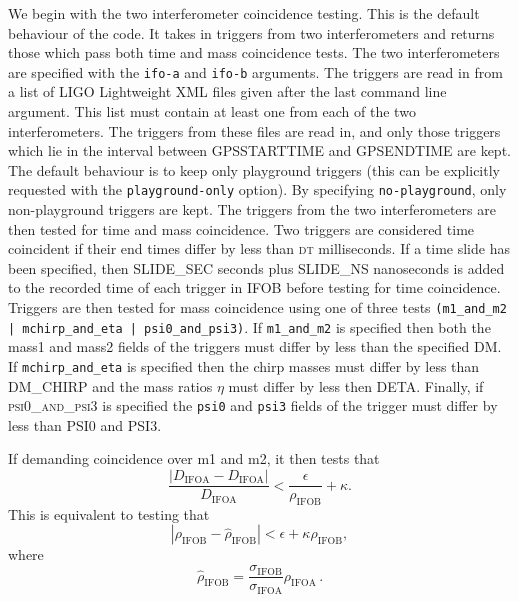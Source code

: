 \begin{entry}
We begin with the two interferometer coincidence testing.  This is the
default behaviour of the code.  It takes in triggers from two
interferometers and returns those which pass both time and mass
coincidence tests.  The two interferometers are specified with the
\texttt{ifo-a} and \texttt{ifo-b} arguments. The triggers are read in
from a list of LIGO Lightweight XML files given after the last command
line argument.  This list must contain at least one from each of the two
interferometers.  The triggers from these files are read in, and only
those triggers which lie in the interval between \textsc{GPSSTARTTIME} and
\textsc{GPSENDTIME} are kept. The default behaviour is to keep only
playground triggers (this can be explicitly requested with the
\texttt{playground-only} option).  By specifying
\texttt{no-playground}, only non-playground triggers are kept.  The
triggers from the two interferometers are then tested for time and mass
coincidence.  Two triggers are considered time coincident if their end
times differ by less than \textsc{dt} milliseconds.  If a time slide has
been specified, then \textsc{SLIDE\_SEC} seconds plus \textsc{SLIDE\_NS}
nanoseconds is added to the recorded time of each trigger in
\textsc{IFOB} before testing for time coincidence.  Triggers are then
tested for mass coincidence using one of three tests
\texttt{(m1\_and\_m2 | mchirp\_and\_eta | psi0\_and\_psi3)}.  If
\texttt{m1\_and\_m2} is specified then both the mass1 and mass2 fields
of the triggers must differ by less than the specified \textsc{DM}.  If
\texttt{mchirp\_and\_eta} is specified then the chirp masses must differ
by less than \textsc{DM\_CHIRP} and the mass ratios $\eta$ must differ
by less then \textsc{DETA}.  Finally, if \textsc{psi0\_and\_psi3} is
specified the \texttt{psi0} and \texttt{psi3} fields of the trigger must
differ by less than \textsc{PSI0} and \textsc{PSI3}.  

If demanding coincidence over m1 and m2, it then tests 
that 
%
\begin{equation} \frac{\left|D_\mathrm{IFOA} -
  D_\mathrm{IFOA}\right|}{D_\mathrm{IFOA}} <
  \frac{\epsilon}{\rho_\mathrm{IFOB}} + \kappa.  \end{equation}
% 
This is equivalent to testing that 
%
\begin{equation}\label{snrtest} \left|\rho_\mathrm{IFOB} -
\hat{\rho}_\mathrm{IFOB}\right| < \epsilon + \kappa\rho_\mathrm{IFOB},
  \end{equation} 
%
where 
%
\begin{equation} \hat{\rho}_\mathrm{IFOB} = \frac{\sigma_\mathrm{IFOB}}
{\sigma_\mathrm{IFOA}} \rho_\mathrm{IFOA} \, .  \end{equation} 
%


\end{entry}
